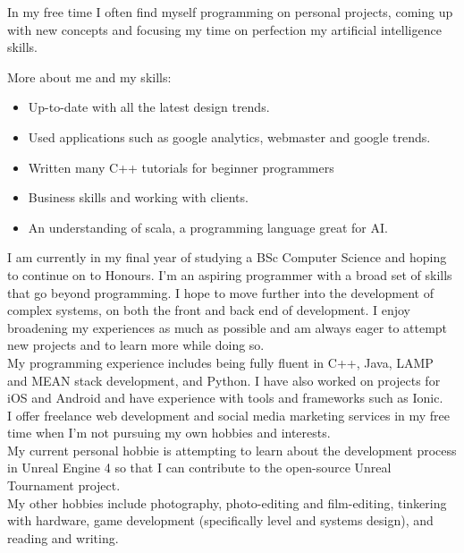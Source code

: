 	In my free time I often find myself programming on personal projects, coming up with new concepts and focusing my time on perfection my artificial intelligence skills. 

	\noindent
	More about me and my skills:
    \begin{itemize}
        \item Up-to-date with all the latest design trends.
        \item Used applications such as google analytics, webmaster and google trends. 
        \item Written many C++ tutorials for beginner programmers
        \item Business skills and working with clients. 
        \item An understanding of scala, a programming language great for AI. 
    \end{itemize}
    
%
%
\newpage
{}
I am currently in my final year of studying a BSc Computer Science and hoping to continue on to Honours. I'm an aspiring programmer with a broad set of skills that go beyond programming. I hope to move further into the development of complex systems, on both the front and back end of development. I enjoy broadening my experiences as much as possible and am always eager to attempt new projects and to learn more while doing so.\\

My programming experience includes being fully fluent in C++, Java, LAMP and MEAN stack development, and Python. I have also worked on projects for iOS and Android and have experience with tools and frameworks such as Ionic.\\

I offer freelance web development and social media marketing services in my free time when I'm not pursuing my own hobbies and interests.\\

My current personal hobbie is attempting to learn about the development process in Unreal Engine 4 so that I can contribute to the open-source Unreal Tournament project.\\

My other hobbies include photography, photo-editing and film-editing, tinkering with hardware, game development (specifically level and systems design), and reading and writing.\\


